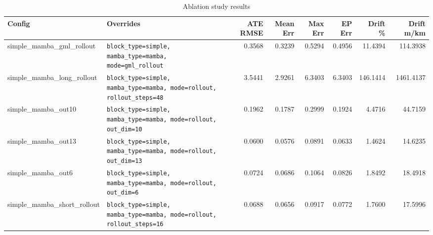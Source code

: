 \begin{table}[ht]
\centering
\caption{Ablation study results}
\label{tab:ablation}
\small
\setlength{\tabcolsep}{4pt}
\begin{tabular}{ll rr rr rr}
\toprule
\textbf{Config} & \textbf{Overrides} &
\textbf{ATE RMSE} & \textbf{Mean Err} &
\textbf{Max Err} & \textbf{EP Err} &
\textbf{Drift \%} & \textbf{Drift m/km} \\
\midrule
simple\_mamba\_gml\_rollout & \texttt{block\_type=simple, mamba\_type=mamba, mode=gml\_rollout} & 0.3568 & 0.3239 & 0.5294 & 0.4956 & 11.4394 & 114.3938 \\
simple\_mamba\_long\_rollout & \texttt{block\_type=simple, mamba\_type=mamba, mode=rollout, rollout\_steps=48} & 3.5441 & 2.9261 & 6.3403 & 6.3403 & 146.1414 & 1461.4137 \\
simple\_mamba\_out10 & \texttt{block\_type=simple, mamba\_type=mamba, mode=rollout, out\_dim=10} & 0.1962 & 0.1787 & 0.2999 & 0.1924 & 4.4716 & 44.7159 \\
simple\_mamba\_out13 & \texttt{block\_type=simple, mamba\_type=mamba, mode=rollout, out\_dim=13} & 0.0600 & 0.0576 & 0.0891 & 0.0633 & 1.4624 & 14.6235 \\
simple\_mamba\_out6 & \texttt{block\_type=simple, mamba\_type=mamba, mode=rollout, out\_dim=6} & 0.0724 & 0.0686 & 0.1064 & 0.0826 & 1.8492 & 18.4918 \\
simple\_mamba\_short\_rollout & \texttt{block\_type=simple, mamba\_type=mamba, mode=rollout, rollout\_steps=16} & 0.0688 & 0.0656 & 0.0917 & 0.0772 & 1.7600 & 17.5996 \\
\bottomrule
\end{tabular}
\end{table}

